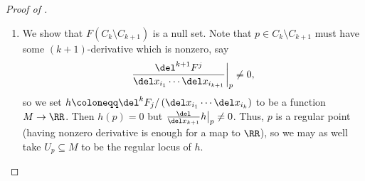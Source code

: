 \documentclass[../notes.tex]{subfiles}
\begin{document}
\begin{proof}[Proof of ]
\begin{enumerate}
		Set $y_1\coloneqq F_1$ and $y_i\coloneqq x_i$ for each $2\le i\le m$ so that the matrix of partial derivatives $\left[\frac{\del y_j}{\del x_i}\right]_{1\le i,j\le m}$ is invertible at $p$. In particular, $\Phi\coloneqq(y_1,\ldots,y_m)$ is a local diffeomorphism around $p$, so passing to an open neighborhood of $p\in U$ allows us to make $\Phi$ into a genuine diffeomorphism $\Phi\colon U\to U'$. Because $\Phi$ is a diffeomorphism, we see that showing the critical values of $F$ is a null set is then equivalent to show that the critical values of $\widetilde F\coloneqq F\circ\Phi^{-1}$ is a null set, so we will focus on $\widetilde F$.

		Now, the point of passing to $\widetilde F$ is that
		\[(F_1(x_1,\ldots,x_m),\ldots)=F(x_1,\ldots,x_m)=\left(\widetilde F\circ\Phi\right)(x_1,\ldots,x_m)=(y_1(x_1,\ldots,x_m),\ldots),\]
		so the moral of the story is that
		\[\widetilde F(x_1,\ldots,x_m)=(x_1,\ldots),\]
		where the ``$\ldots$'' simply means that we have some other functions that we haven't bothered to write out. The point is that we can compute the Jacobian of $\widetilde F$ as a block matrix
		\[\begin{bmatrix}
			1 & 0 & \cdots & 0 \\
			* & \del\widetilde F_2/\del x_2 & \cdots & \del\widetilde F_2/\del x_m \\
			\vdots & \vdots & \ddots & \vdots \\
			* & \del\widetilde F_n/\del x_2 & \cdots & \del\widetilde F_n/\del x_m
		\end{bmatrix}.\]
		The moral of the story is that surjectivity of $F$ is equivalent to surjectivity of $\widetilde F$. Now set
		\[\widetilde C_s\coloneqq C\cap\left(\{s\}\times\RR^{n-1}\right)\]
		to be the critical points of $F$ whose first coordinate is $s$. So we can integrate over $s$ to get the desired null sets, using the inductive hypothesis because we moved down in coordinates.

		\item We show that $F(C_k\setminus C_{k+1})$ is a null set. Note that $p\in C_k\setminus C_{k+1}$ must have some $(k+1)$-derivative which is nonzero, say
		\[\frac{\del^{k+1} F^j}{\del x_{i_1}\cdots\del x_{i_{k+1}}}\bigg|_p\ne0,\]
		so we set $h\coloneqq\del^kF_j/\left(\del x_{i_1}\cdots\del x_{i_{k}}\right)$ to be a function $M\to\RR$. Then $h(p)=0$ but $\frac{\del}{\del x_{k+1}}h\big|_p\ne0$. Thus, $p$ is a regular point (having nonzero derivative is enough for a map to $\RR$), so we may as well take $U_p\subseteq M$ to be the regular locus of $h$.


\end{enumerate}
\end{proof}
\end{document}
